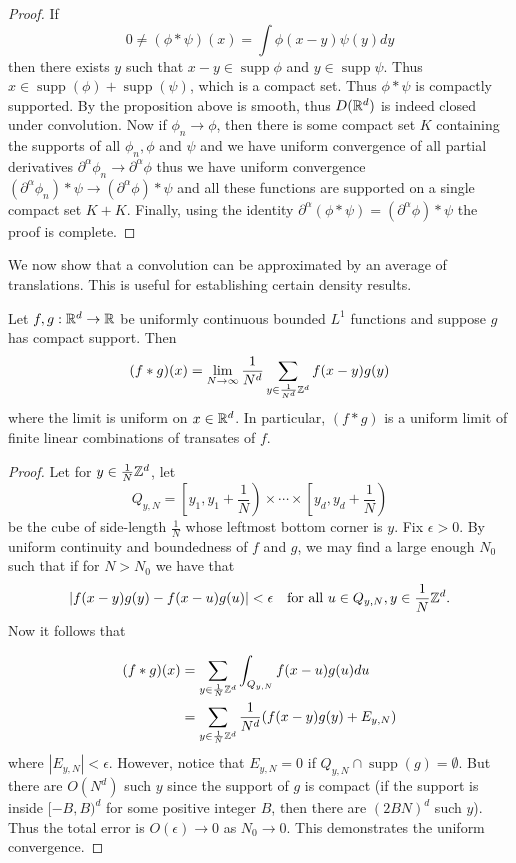 \documentclass[twoside, a4paper, 10pt]{amsart}
\begin{document}
\begin{proof} If $$0 \neq (\phi * \psi) (x) = \int \phi(x-y) \psi(y) dy$$ then there exists $y$ such that $x-y \in \operatorname{supp} \phi $ and $y \in \operatorname{supp} \psi$. Thus $x \in \operatorname{supp}(\phi) + \operatorname{supp}(\psi)$, which is a compact set. Thus $\phi * \psi$ is compactly supported. By the proposition above is smooth, thus $D(\mathbb{R}^d)$ is indeed closed under convolution.  Now if $\phi_n \to \phi$, then there is some compact set $K$ containing the supports of all $\phi_n, \phi$ and $\psi$ and we have uniform convergence of all partial derivatives $\partial^{\alpha} \phi_n \to \partial^{\alpha} \phi$ thus we have uniform convergence $(\partial^{\alpha} \phi_n) * \psi \to (\partial^{\alpha} \phi) * \psi$ and all these functions are supported on a single compact set $K + K$. Finally, using the identity $\partial^{\alpha} (\phi * \psi) = (\partial^{\alpha} \phi) * \psi$ the proof is complete.  \end{proof}

We now show that a convolution can be approximated by an average of translations. This is useful for establishing certain density results.

\begin{prop}\label{prop: convolution is approximate average} Let $f,g:\mathbb{R}^d \to \mathbb{R}$ be uniformly continuous bounded $L^1$ functions and suppose $g$ has compact support. Then $$(f * g)(x) = \lim_{N \to \infty} \frac{1}{N^d} \sum_{y \in \frac{1}{N^d}\mathbb{Z}^d} f(x-y) g(y)$$ where the limit is uniform on $x \in \mathbb{R}^d$. In particular, $(f*g)$ is a uniform limit of finite linear combinations of transates of $f$.

\end{prop}

\begin{proof} Let for $y \in \frac{1}{N}\mathbb{Z}^d$, let $$Q_{y,N} = \left[y_1, y_1 + \frac{1}{N}\right) \times \cdots \times \left[y_d, y_d + \frac{1}{N}\right) $$ be the cube of side-length $\frac{1}{N}$ whose leftmost bottom corner is $y$. Fix $\epsilon>0$. By uniform continuity and boundedness of $f$ and $g$, we may find a large enough $N_0$ such that if for $N>N_0$ we have that $$|f(x-y)g(y) - f(x-u)g(u)| < \epsilon \quad\text{for all } u \in Q_{y,N}, y \in \frac{1}{N}\mathbb{Z}^d.$$ Now it follows that 

\begin{align*} (f * g)(x) &= \sum_{y \in \frac{1}{N}\mathbb{Z}^d} \int_{Q_{y,N}} f(x-u)g(u) du \\ &= \sum_{y \in \frac{1}{N}\mathbb{Z}^d} \frac{1}{N^d}(f(x-y)g(y) + E_{y,N})\end{align*} where $|E_{y,N}|<\epsilon$. However, notice that $E_{y,N} = 0$ if $Q_{y,N} \cap \operatorname{supp}(g) = \emptyset$. But there are $O(N^d)$ such $y$ since the support of $g$ is compact (if the support is inside $[-B,B)^d$ for some positive integer $B$, then there are $(2BN)^d$ such $y$). Thus the total error is $O(\epsilon) \to 0$ as $N_0 \to 0$. This demonstrates the uniform convergence. \end{proof}
\end{document}
